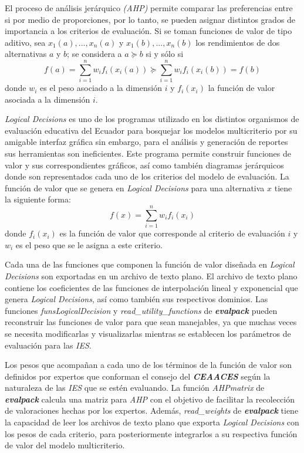 El proceso de análisis jerárquico \textit{(AHP)} permite comparar las preferencias entre si por
medio de proporciones, por lo tanto, se pueden asignar distintos grados de importancia a los
criterios de evaluación. Si se toman funciones de valor de tipo aditivo, sea $x_{1}(a),...,
x_{n}(a)$ y $x_{1}(b),..., x_{n}(b)$ los rendimientos de dos alternativas $a$ y $b$; se considera a
$a \succeq b$ si y sólo si
\[f(a)=\sum\limits_{i=1}^{n} w_i f_i(x_i(a))\succeq \sum\limits_{i=1}^{n}w_i f_i(x_i(b))=f(b)\]
donde $w_i$ es el peso asociado a la dimensión $i$ y $f_i(x_i)$ la función de valor asociada
a la dimensión $i$\citep{2}.   
   
{\it Logical Decisions\textregistered } es uno de los programas utilizado en los distintos
organismos de evaluación educativa del Ecuador para bosquejar los modelos multicriterio por su 
amigable interfaz gráfica sin embargo, para el análisis y generación de reportes sus herramientas
son ineficientes. Este programa permite construir funciones de valor y sus correspondientes
gráficos, así como también diagramas jerárquicos donde son representados cada uno de los criterios
del modelo de evaluación. La función de valor que se genera en {\it Logical Decisions\textregistered
} para una alternativa $x$ tiene la siguiente forma:
\[f(x)=\sum\limits_{i=1}^{n}w_i f_i(x_i)\]
donde $f_i(x_i)$ es la función de valor que corresponde al criterio de evaluación $i$ y $w_i$
es el peso que se le asigna a este criterio.
 
Cada una de las funciones que componen la función de valor diseñada en {\it Logical
Decisions\textregistered } son exportadas en un archivo de texto plano. El archivo de texto plano
contiene los coeficientes de las funciones de interpolación lineal y exponencial que genera {\it
Logical Decisions\textregistered }, así como también sus respectivos dominios. Las funciones {\it
funsLogicalDecision} y {\it read\_utility\_functions} de \textit{\textbf{evalpack}} pueden
reconstruir las funciones de valor para que sean manejables, ya que muchas veces se necesita
modificarlas y visualizarlas mientras se establecen los parámetros de evaluación para las {\it IES}.

Los pesos que acompañan a cada uno de los términos de la función de valor son definidos por expertos
que conforman el consejo del \textit{\textbf{CEAACES}} según la naturaleza de las {\it IES} que se
estén evaluando. La función {\it AHPmatrix} de \textit{\textbf{evalpack}} calcula una matriz para
{\it AHP} con el objetivo de facilitar la recolección de  valoraciones hechas por los expertos.
Además, {\it read\_weights} de \textit{\textbf{evalpack}} tiene la capacidad de leer los archivos de
texto plano que exporta {\it Logical Decisions\textregistered } con los pesos de cada criterio, para
posteriormente integrarlos a su respectiva función de valor del modelo multicriterio.  

